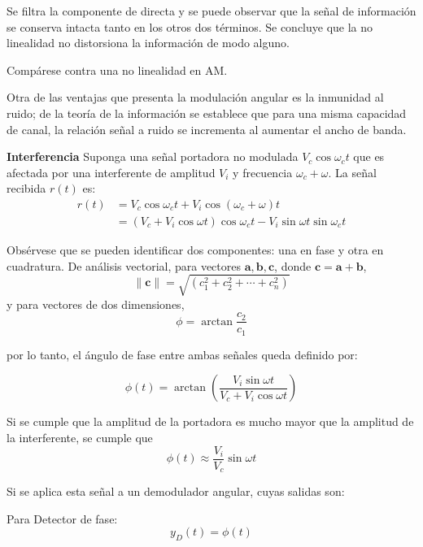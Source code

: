 \documentclass[12pt,letterpaper,titlepage,twoside]{book}
\begin{document}
Se filtra la componente de directa y se puede observar que la señal de información se conserva intacta tanto en los otros dos términos. Se concluye que la no linealidad no distorsiona la información de modo alguno.

Compárese contra una no linealidad en AM.

Otra de las ventajas que presenta la modulación angular es la inmunidad al ruido; de la teoría de la información se establece que para una misma capacidad de canal, la relación señal a ruido se incrementa al aumentar el ancho de banda.

\textbf{Interferencia}  Suponga una señal portadora no  modulada $V_c \cos \omega_c t$ que es afectada por una interferente  de amplitud $V_i$ y frecuencia $\omega_c + \omega$. La señal recibida $r(t)$ es:
\begin{align}
r(t) &= V_c \cos \omega_c t + V_i \cos \left( \omega_c + \omega \right) t \\ 
&= \left( V_c + V_i \cos \omega t \right) \cos \omega_c t - V_i \sin \omega t \sin \omega_ct
\end{align}

Obsérvese que se pueden identificar dos componentes: una en fase y otra en cuadratura. De análisis vectorial, para vectores $\mathbf{a,b,c}$, donde $\mathbf{c= a+b}$, 
\begin{equation}
\| \mathbf{c} \| = \sqrt{\left( c_1^{2}+c_2^{2}+ \cdots + c_n^{2} \right)}
\end{equation}
y para vectores de dos dimensiones, 
 \begin{equation}
 \phi  =  \arctan \frac{c_2}{c_1}
 \end{equation}

por lo tanto, el ángulo de fase entre ambas señales queda definido por:


\begin{equation}
\phi(t) = \arctan \left( \frac{V_i \sin \omega t}{V_c + V_i \cos \omega t}  \right)
\end{equation}

Si se cumple que la amplitud de la portadora es mucho mayor que la amplitud de la interferente, se cumple que 
\begin{equation}
\phi(t) \approx \frac{V_i}{V_c} \sin \omega t
\end{equation}

Si se aplica esta señal a un demodulador angular, cuyas salidas son:

Para Detector de fase:  $$y_D(t)=\phi(t)$$
\end{document}
